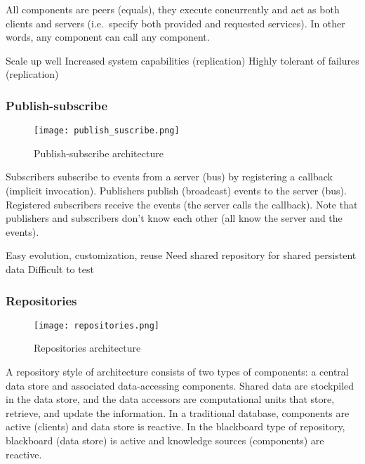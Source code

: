 All components are peers (equals), they execute concurrently and act as both
clients and servers (i.e.\ specify both provided and requested services).
\newline
In other words, any component can call any component.

\begin{itemize}
    \proitem{} Scale up well
    \proitem{} Increased system capabilities (replication)
    \proitem{} Highly tolerant of failures (replication)
\end{itemize}

\subsubsection{Publish-subscribe}

\begin{figure}[!ht]
    \centering
    \texttt{[image: publish\_suscribe.png]}
    \caption{Publish-subscribe architecture}
\end{figure}

Subscribers subscribe to events from a server (bus) by registering a callback
(implicit invocation). Publishers publish (broadcast) events to the server
(bus). Registered subscribers receive the events (the server calls the
callback).\newline
Note that publishers and subscribers don't know each other (all know the server
and the events).

\begin{itemize}
    \proitem{} Easy evolution, customization, reuse
    \consitem{} Need shared repository for shared persistent data
    \consitem{} Difficult to test
\end{itemize}

\subsubsection{Repositories}

\begin{figure}[!ht]
    \centering
    \texttt{[image: repositories.png]}
    \caption{Repositories architecture}
\end{figure}

A repository style of architecture consists of two types of components: a
central data store and associated data-accessing components. Shared data are
stockpiled in the data store, and the data accessors are computational units
that store, retrieve, and update the information. \newline
In a traditional database, components are active (clients) and data store is
reactive. In the blackboard type of repository, blackboard (data store) is
active and knowledge sources (components) are reactive.

